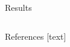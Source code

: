 \documentclass[final,hyperref={pdfpagelabels=true}]{beamer}
\begin{document}
\begin{frame}
\begin{center}
\begin{minipage}{0.99\textwidth}
\begin{block}{Results}
\begin{columns}[t]
\begin{column}{0.5\linewidth}
				\end{column}
			\end{columns}
		\end{block}
	\end{minipage}
	\begin{minipage}{0.99\textwidth}
		\begin{block}{References}
%			
%       		
			\small
			[text]
			\begin{multicols}{2}
			\centering
			
			
			\end{multicols}
		\end{block}
	\end{minipage}
	\end{center}
    
%      
%
%      
%
%
%      
%      
%      

\end{frame}
\end{document}
